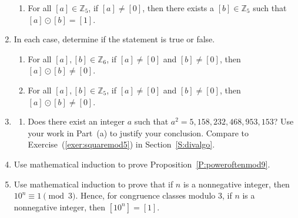 \begin{enumerate}
\begin{enumerate}
\item For all  $[ a ] \in \mathbb{Z}_5 $, if  
      $[ a ] \ne [ 0 ]$, then there exists a  
      $[ b ] \in \mathbb{Z}_5 $ such that 
      $[ a ] \odot [ b ] = [ 1 ]$.
\end{enumerate}

\item In each case, determine if the statement is true or false. 
\label{exer:sec74-5}%
\begin{enumerate}
\item For all  $[ a ], [ b ] \in \mathbb{Z}_6 $, if  
      $[ a ] \ne [ 0 ]$ and $[ b ] \ne [ 0 ]$, then 
      $[ a ] \odot [ b ] \ne [ 0 ]$.

\item For all  $[ a ], [ b ] \in \mathbb{Z}_5 $, if  
      $[ a ] \ne [ 0 ]$ and $[ b ] \ne [ 0 ]$, then 
      $[ a ] \odot [ b ] \ne [ 0 ]$.
\end{enumerate}

\item\label{exer:squaresinZ5} 
\begin{enumerate}
\yitem Prove the following proposition:  

\item Does there exist an integer $a$ such that $a^2 = 5,158,232,468,953,153$?  Use your work in Part~(a) to justify your conclusion.  Compare to Exercise~(\ref{exer:squaremod5}) in 
Section~\ref{S:divalgo}.
\end{enumerate}

\item Use mathematical induction to prove Proposition~\ref{P:poweroftenmod9}. 
\label{exer:poweroftenmod9}%


\item Use mathematical induction to prove that if  $n$  is a nonnegative integer, then  
      $10^n  \equiv 1 \pmod 3$.  Hence, for congruence classes modulo 3,  if $n$  is a nonnegative integer, then 
      $[ {10^n } ] = [ 1 ]$.
\label{exer:poweroftenmod3}



\end{enumerate}
